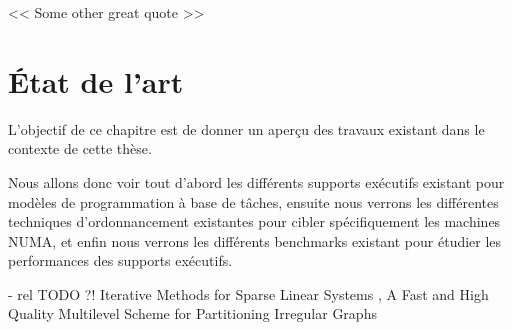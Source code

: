 
\begin{savequote}[6cm]
<< Some other great quote  >>
\end{savequote}
\chapter{État de l'art}
\chaptertoc

L'objectif de ce chapitre est de donner un aperçu des travaux existant dans le contexte de cette thèse.

Nous allons donc voir tout d'abord les différents supports exécutifs existant pour modèles de programmation à base de tâches, ensuite nous verrons les différentes techniques d'ordonnancement existantes pour cibler spécifiquement les machines NUMA, et enfin nous verrons les différents benchmarks existant pour étudier les performances des supports exécutifs.






 - rel TODO ?!
\cite{Saad2013} Iterative Methods for Sparse Linear Systems
\cite{Karypis1998}, A Fast and High Quality Multilevel Scheme for Partitioning Irregular Graphs





